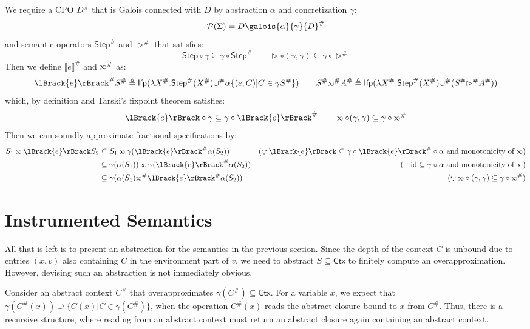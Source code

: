 \documentclass[acmsmall,review]{acmart}\settopmatter{printfolios=true,printccs=false,printacmref=false}
\theoremstyle{definition}
\theoremstyle{plain}
\newcommand*{\pset}{\mathcal{P}}
\newcommand*{\Abs}[1]{{#1}^{\#}}
\newcommand*{\Ctx}{\mathsf{Ctx}}
\newcommand*{\lfp}{\mathsf{lfp}}
\newcommand*{\Step}{\mathsf{Step}}
\newcommand*{\semlink}{\mathbin{\rotatebox[origin=c]{180}{$\propto$}}}
\newcommand*{\sembracket}[1]{\lBrack{#1}\rBrack}
\begin{document}
We require a CPO $\Abs{D}$ that is Galois connected with $D$ by abstraction $\alpha$ and concretization $\gamma$:
\[\pset(\Sigma)=D\galois{\alpha}{\gamma}\Abs{D}\]
and semantic operators $\Abs\Step$ and $\Abs\rhd$ that satisfies:
\[\Step\circ\gamma\subseteq\gamma\circ\Abs\Step\qquad\rhd\circ(\gamma,\gamma)\subseteq\gamma\circ\Abs\rhd\]
Then we define $\Abs{\sembracket{e}}$ and $\Abs\semlink$ as:
\[
  \Abs{\sembracket{e}}\Abs{S}\triangleq\lfp(\lambda\Abs{X}.\Abs\Step(\Abs{X})\Abs\cup\alpha\{(e,C)|C\in\gamma\Abs{S}\})\qquad
  \Abs{S}\Abs\semlink\Abs{A}\triangleq\lfp(\lambda\Abs{X}.\Abs\Step(\Abs{X})\Abs\cup(\Abs{S}\Abs\rhd\Abs{A}))
\]
which, by definition and Tarski's fixpoint theorem satisfies:
\[\sembracket{e}\circ\gamma\subseteq\gamma\circ\Abs{\sembracket{e}}\qquad\semlink\circ(\gamma,\gamma)\subseteq\gamma\circ\Abs\semlink\]
Then we can soundly approximate fractional specifications by:
\begin{align*}
  S_1\semlink\sembracket{e}S_2 & \subseteq S_1\semlink\gamma(\Abs{\sembracket{e}}\alpha(S_2))                 & (\because\sembracket{e}\subseteq\gamma\circ\Abs{\sembracket{e}}\circ\alpha\text{ and monotonicity of }\semlink) \\
                               & \subseteq \gamma(\alpha(S_1))\semlink\gamma(\Abs{\sembracket{e}}\alpha(S_2)) & (\because\text{id}\subseteq\gamma\circ\alpha\text{ and monotonicity of }\semlink)                               \\
                               & \subseteq\gamma(\alpha(S_1)\Abs\semlink\Abs{\sembracket{e}}\alpha(S_2))      & (\because\semlink\circ(\gamma,\gamma)\subseteq\gamma\circ\Abs\semlink)
\end{align*}
\section{Instrumented Semantics}
All that is left is to present an abstraction for the semantics in the previous section.
Since the depth of the context $C$ is unbound due to entries $(x,v)$ also containing $C$ in the environment part of $v$, we need to abstract $S\subseteq\Ctx$ to finitely compute an overapproximation.
However, devising such an abstraction is not immediately obvious.

Consider an abstract context $\Abs{C}$ that overapproximates $\gamma(\Abs{C})\subseteq\Ctx$.
For a variable $x$, we expect that $\gamma(\Abs{C}(x))\supseteq\{C(x)|C\in\gamma(\Abs{C})\}$, when the operation $\Abs{C}(x)$ reads the abstract closure bound to $x$ from $\Abs{C}$.
Thus, there is a recursive structure, where reading from an abstract context must return an abstract closure again containing an abstract context.
\end{document}

